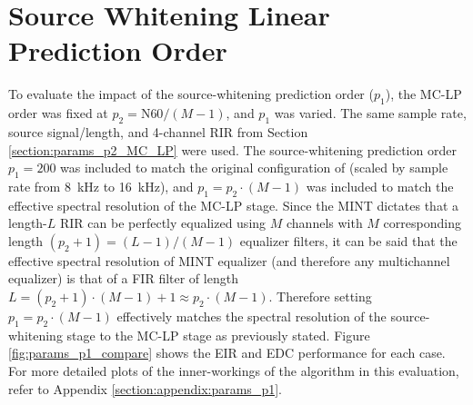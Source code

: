 \section{Source Whitening Linear Prediction Order} \label{section:params_p1} 

To evaluate the impact of the source-whitening prediction order ($p_1$), the MC-LP order was fixed at $p_2 = \mathrm{N60} / \left(M-1\right)$, and $p_1$ was varied. The same sample rate, source signal/length, and 4-channel RIR from Section \ref{section:params_p2_MC_LP} were used. The source-whitening prediction order $p_1=200$ was included to match the original configuration of \cite{triki2006delay} (scaled by sample rate from \qty{8}{\kilo\hertz} to \qty{16}{\kilo\hertz}), and $p_1 = p_2 \cdot \left(M-1\right)$ was included to match the effective spectral resolution of the MC-LP stage. Since the MINT dictates that a length-$L$ RIR can be perfectly equalized using $M$ channels with $M$ corresponding length $\left(p_2+1\right) = \left(L-1\right)/\left(M-1\right)$ equalizer filters, it can be said that the effective spectral resolution of MINT equalizer (and therefore any multichannel equalizer) is that of a FIR filter of length $L= \left(p_2+1\right) \cdot \left(M-1\right)  + 1 \approx p_2 \cdot \left(M-1\right)$. Therefore setting $p_1 = p_2 \cdot (M-1)$ effectively matches the spectral resolution of the source-whitening stage to the MC-LP stage as previously stated. Figure \ref{fig:params_p1_compare} shows the EIR and EDC performance for each case. For more detailed plots of the inner-workings of the algorithm in this evaluation, refer to Appendix \ref{section:appendix:params_p1}.


%

